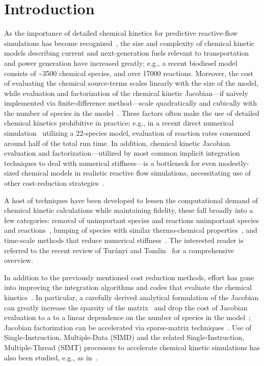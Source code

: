 \documentclass[12pt,number,sort&compress,preprint]{elsarticle}
\begin{document}
\section{Introduction}
%

As the importance of detailed chemical kinetics for predictive reactive-flow simulations has become recognized~\cite{LU2009192}, the size and complexity of chemical kinetic models describing current and next-generation fuels relevant to transportation and power generation have increased greatly; e.g., a recent biodiesel model~\cite{WESTBROOK2011742} consists of \textasciitilde\num{3500} chemical species, and over \num{17000} reactions.
Moreover, the cost of evaluating the chemical source-terms scales linearly with the size of the model, while evaluation and factorization of the chemical kinetic Jacobian---if naively implemented via finite-difference method---scale quadratically and cubically with the number of species in the model~\cite{LU2009192}.
These factors often make the use of detailed chemical kinetics prohibitive in practice; e.g., in a recent direct numerical simulation~\cite{Spafford:2010aa} utilizing a 22-species model, evaluation of reaction rates consumed around half of the total run time.
In addition, chemical kinetic Jacobian evaluation and factorization---utilized by most common implicit integration techniques to deal with numerical stiffness---is a bottleneck for even modestly-sized chemical models in realistic reactive flow simulations, necessitating use of other cost-reduction strategies~\cite{LU2009192}.

A host of techniques have been developed to lessen the computational demand of chemical kinetic calculations while maintaining fidelity, these fall broadly into a few categories: removal of unimportant species and reactions unimportant species and reactions~\cite{Lu:2006bb,Pepiot-Desjardins:2008,Hiremath:2010jw,Niemeyer:2010bt,Curtis:2015}, lumping of species with similar thermo-chemical properties~\cite{Lu:2007,Ahmed:2007fa,Pepiot:2008kq}, and time-scale methods that reduce numerical stiffness~\cite{Maas:1992ws,Lam:1994ws,Lu:2001ve,Gou:2010}.
The interested reader is referred to the recent review of Tur\'anyi and Tomlin~\cite{turanyi2016analysis} for a comprehensive overview.

In addition to the previously mentioned cost reduction methods, effort has gone into improving the integration algorithms and codes that evaluate the chemical kinetics~\cite{Gou:2010,SCHWER2002270,Niemeyer:2016aa,GAO2015287}.
In particular, a carefully derived analytical formulation of the Jacobian can greatly increase the sparsity of the matrix~\cite{SCHWER2002270} and drop the cost of Jacobian evaluation to a to a linear dependence on the number of species in the model~\cite{LU2009192}; Jacobian factorization can be accelerated via sparse-matrix techniques~\cite{superlu99}.
Use of Single-Instruction, Multiple-Data (SIMD) and the related Single-Instruction, Multiple-Thread (SIMT) processors to accelerate chemical kinetic simulations has also been studied, e.g., as in~\cite{CurtisGPU:2017,Sewerin20151375,Shi:2012aa,Niemeyer:2016aa}.
\end{document}

